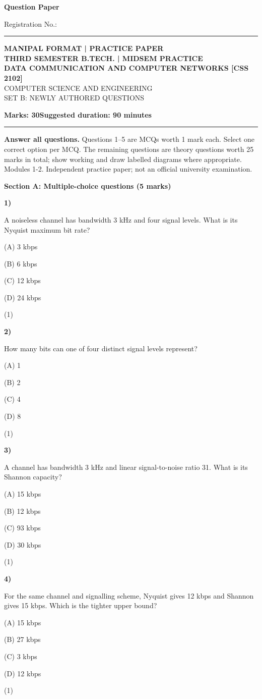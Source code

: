 \documentclass[11pt,a4paper]{article}
\newcommand{\question}[3]{\par\vspace{8pt}\noindent\begin{minipage}[t]{0.075\linewidth}\textbf{#1)}\end{minipage}\begin{minipage}[t]{0.855\linewidth}#3\end{minipage}\hfill\begin{minipage}[t]{0.055\linewidth}\raggedleft(#2)\end{minipage}\par}
\begin{document}
{\LARGE\bfseries Question Paper}\hfill {\small Registration No.: \rule{33mm}{0.3pt}}\par\vspace{8pt}
\begin{center}{\large\bfseries MANIPAL FORMAT | PRACTICE PAPER}\\[6pt]{\bfseries THIRD SEMESTER B.TECH. | MIDSEM PRACTICE}\\[4pt]{\bfseries DATA COMMUNICATION AND COMPUTER NETWORKS [CSS 2102]}\\[4pt]{\small COMPUTER SCIENCE AND ENGINEERING}\\[3pt]{\small SET B: NEWLY AUTHORED QUESTIONS}\end{center}
\textbf{Marks: 30}\hfill\textbf{Suggested duration: 90 minutes}\par\vspace{3pt}\hrule\vspace{5pt}
{\small\textbf{Answer all questions.} Questions 1--5 are MCQs worth 1 mark each. Select one correct option per MCQ. The remaining questions are theory questions worth 25 marks in total; show working and draw labelled diagrams where appropriate. Modules 1-2. Independent practice paper; not an official university examination.}\par
\medskip\textbf{Section A: Multiple-choice questions (5 marks)}\par
\question{1}{1}{A noiseless channel has bandwidth 3 kHz and four signal levels. What is its Nyquist maximum bit rate?\par (A) 3 kbps\par (B) 6 kbps\par (C) 12 kbps\par (D) 24 kbps}
\question{2}{1}{How many bits can one of four distinct signal levels represent?\par (A) 1\par (B) 2\par (C) 4\par (D) 8}
\question{3}{1}{A channel has bandwidth 3 kHz and linear signal-to-noise ratio 31. What is its Shannon capacity?\par (A) 15 kbps\par (B) 12 kbps\par (C) 93 kbps\par (D) 30 kbps}
\question{4}{1}{For the same channel and signalling scheme, Nyquist gives 12 kbps and Shannon gives 15 kbps. Which is the tighter upper bound?\par (A) 15 kbps\par (B) 27 kbps\par (C) 3 kbps\par (D) 12 kbps}
\end{document}
